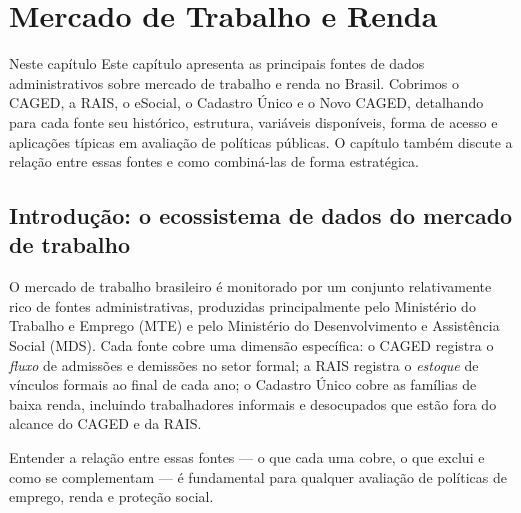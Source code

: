 
\chapter{Mercado de Trabalho e Renda}

\begin{boxdestaque}{Neste capítulo}
Este capítulo apresenta as principais fontes de dados administrativos sobre mercado de trabalho e renda no Brasil. Cobrimos o CAGED, a RAIS, o eSocial, o Cadastro Único e o Novo CAGED, detalhando para cada fonte seu histórico, estrutura, variáveis disponíveis, forma de acesso e aplicações típicas em avaliação de políticas públicas. O capítulo também discute a relação entre essas fontes e como combiná-las de forma estratégica.
\end{boxdestaque}

\section{Introdução: o ecossistema de dados do mercado de trabalho}

O mercado de trabalho brasileiro é monitorado por um conjunto relativamente rico de fontes administrativas, produzidas principalmente pelo Ministério do Trabalho e Emprego (MTE) e pelo Ministério do Desenvolvimento e Assistência Social (MDS). Cada fonte cobre uma dimensão específica: o CAGED registra o \textit{fluxo} de admissões e demissões no setor formal; a RAIS registra o \textit{estoque} de vínculos formais ao final de cada ano; o Cadastro Único cobre as famílias de baixa renda, incluindo trabalhadores informais e desocupados que estão fora do alcance do CAGED e da RAIS.

Entender a relação entre essas fontes — o que cada uma cobre, o que exclui e como se complementam — é fundamental para qualquer avaliação de políticas de emprego, renda e proteção social.

